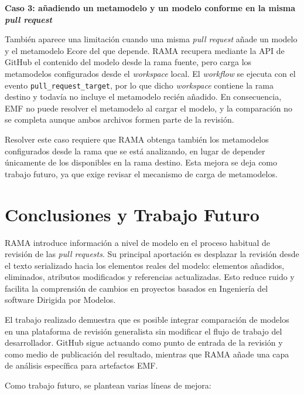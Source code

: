 \documentclass[11pt]{article}
\begin{document}
\textbf{Caso 3: añadiendo un metamodelo y un modelo conforme en la misma \textit{pull request}}

También aparece una limitación cuando una misma \textit{pull request} añade un modelo y el metamodelo Ecore del que depende. RAMA recupera mediante la API de GitHub el contenido del modelo desde la rama fuente, pero carga los metamodelos configurados desde el \textit{workspace} local. El \textit{workflow} se ejecuta con el evento \texttt{pull\_request\_target}, por lo que dicho \textit{workspace} contiene la rama destino y todavía no incluye el metamodelo recién añadido. En consecuencia, EMF no puede resolver el metamodelo al cargar el modelo, y la comparación no se completa aunque ambos archivos formen parte de la revisión.

Resolver este caso requiere que RAMA obtenga también los metamodelos configurados desde la rama que se está analizando, en lugar de depender únicamente de los disponibles en la rama destino. Esta mejora se deja como trabajo futuro, ya que exige revisar el mecanismo de carga de metamodelos.

\newpage

\section{Conclusiones y Trabajo Futuro}
\label{sec:conclusiones-trabajo-futuro}

RAMA introduce información a nivel de modelo en el proceso habitual de revisión de las \textit{pull requests}. Su principal aportación es desplazar la revisión desde el texto serializado hacia los elementos reales del modelo: elementos añadidos, eliminados, atributos modificados y referencias actualizadas. Esto reduce ruido y facilita la comprensión de cambios en proyectos basados en Ingeniería del software Dirigida por Modelos.

El trabajo realizado demuestra que es posible integrar comparación de modelos en una plataforma de revisión generalista sin modificar el flujo de trabajo del desarrollador. GitHub sigue actuando como punto de entrada de la revisión y como medio de publicación del resultado, mientras que RAMA añade una capa de análisis específica para artefactos EMF.

Como trabajo futuro, se plantean varias líneas de mejora:
\end{document}
